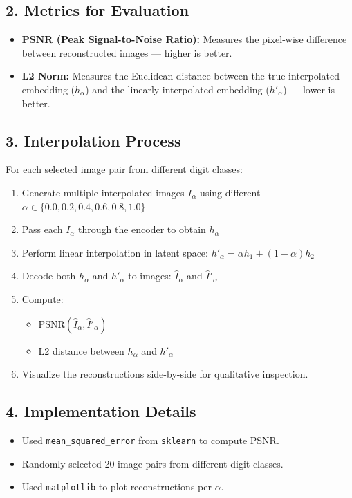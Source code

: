\documentclass[12pt]{article}
\begin{document}
\subsection*{2. Metrics for Evaluation}
\begin{itemize}
    \item \textbf{PSNR (Peak Signal-to-Noise Ratio):} Measures the pixel-wise difference between reconstructed images — higher is better.
    \item \textbf{L2 Norm:} Measures the Euclidean distance between the true interpolated embedding ($h_\alpha$) and the linearly interpolated embedding ($h'_\alpha$) — lower is better.
\end{itemize}

\subsection*{3. Interpolation Process}
For each selected image pair from different digit classes:
\begin{enumerate}
    \item Generate multiple interpolated images $I_\alpha$ using different $\alpha \in \{0.0, 0.2, 0.4, 0.6, 0.8, 1.0\}$
    \item Pass each $I_\alpha$ through the encoder to obtain $h_\alpha$
    \item Perform linear interpolation in latent space: $h'_\alpha = \alpha h_1 + (1 - \alpha) h_2$
    \item Decode both $h_\alpha$ and $h'_\alpha$ to images: $\hat{I}_\alpha$ and $\hat{I}'_\alpha$
    \item Compute:
    \begin{itemize}
        \item PSNR$(\hat{I}_\alpha, \hat{I}'_\alpha)$
        \item L2 distance between $h_\alpha$ and $h'_\alpha$
    \end{itemize}
    \item Visualize the reconstructions side-by-side for qualitative inspection.
\end{enumerate}

\subsection*{4. Implementation Details}
\begin{itemize}
    \item Used \texttt{mean\_squared\_error} from \texttt{sklearn} to compute PSNR.
    \item Randomly selected 20 image pairs from different digit classes.
    \item Used \texttt{matplotlib} to plot reconstructions per $\alpha$.
\end{itemize}
\end{document}
